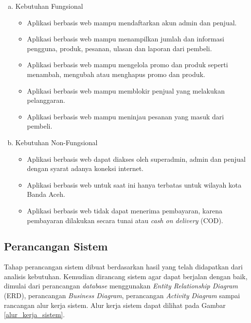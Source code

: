 \begin{enumerate}[a.]
	\item Kebutuhan Fungsional
		\begin{itemize}
		\item Aplikasi berbasis web mampu mendaftarkan akun admin dan penjual.
		\item Aplikasi berbasis web mampu menampilkan jumlah dan informasi pengguna, produk, pesanan, ulasan dan laporan dari pembeli.
		\item Aplikasi berbasis web mampu mengelola promo dan produk seperti menambah, mengubah atau menghapus promo dan produk.
		\item Aplikasi berbasis web mampu memblokir penjual yang melakukan pelanggaran.
		\item Aplikasi berbasis web mampu meninjau pesanan yang masuk dari pembeli.
		\end{itemize}
	
	\item Kebutuhan Non-Fungsional
		\begin{itemize}
		\item Aplikasi berbasis web dapat diakses oleh superadmin, admin dan penjual dengan syarat adanya koneksi internet.
		\item Aplikasi berbasis web untuk saat ini hanya terbatas untuk wilayah kota Banda Aceh.
		\item Aplikasi berbasis web tidak dapat menerima pembayaran, karena pembayaran dilakukan secara tunai atau \textit{cash on delivery} (COD).
		\end{itemize}
	\end{enumerate}



\subsection{Perancangan Sistem}
Tahap perancangan sistem dibuat berdasarkan hasil yang telah didapatkan dari analisis kebutuhan. Kemudian dirancang sistem agar dapat berjalan dengan baik, dimulai dari perancangan \textit{database} menggunakan \textit{Entity Relationship Diagram} (ERD), perancangan \textit{Business Diagram}, perancangan \textit{Activity Diagram} sampai rancangan alur kerja sistem. Alur kerja sistem dapat dilihat pada Gambar \ref{alur_kerja_sistem}.


